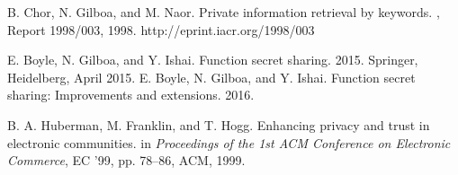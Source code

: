 \begin{thebibliography}{10}
\begin{small}
 B. Chor, N. Gilboa, and M. Naor. \newblock Private information retrieval by keywords. , Report 1998/003, 1998. http://eprint.iacr.org/1998/003

 E. Boyle, N. Gilboa, and Y. Ishai. \newblock Function secret sharing.  2015.
Springer, Heidelberg, April 2015.
 E. Boyle, N. Gilboa, and Y. Ishai. \newblock Function secret sharing: Improvements and extensions.  2016.

  B. A. Huberman, M. Franklin, and T. Hogg. \newblock Enhancing privacy and trust in electronic communities. \newblock in
{\em Proceedings of the 1st ACM Conference on Electronic Commerce}, EC ’99, pp. 78–86, ACM, 1999.




\end{small}
\end{thebibliography}

 
 		
